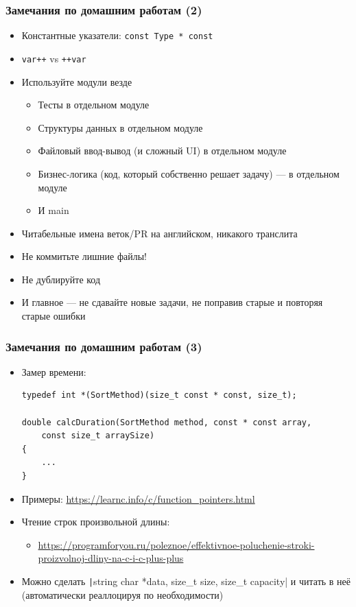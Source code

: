 \documentclass{../../slides-style}
\begin{document}
    \begin{frame}
        \frametitle{Замечания по домашним работам (2)}
        \begin{itemize}
            \item Константные указатели: \texttt{const Type * const}
            \item \texttt{var++} vs \texttt{++var}
            \item Используйте модули везде
            \begin{itemize}
                \item Тесты в отдельном модуле
                \item Структуры данных в отдельном модуле
                \item Файловый ввод-вывод (и сложный UI) в отдельном модуле
                \item Бизнес-логика (код, который собственно решает задачу) --- в отдельном модуле
                \item И main
            \end{itemize}
            \item Читабельные имена веток/PR на английском, никакого транслита
            \item Не коммитьте лишние файлы!
            \item Не дублируйте код
            \item И главное --- не сдавайте новые задачи, не поправив старые и повторяя старые ошибки
        \end{itemize}
    \end{frame}

    \begin{frame}[fragile]
        \frametitle{Замечания по домашним работам (3)}
        \begin{itemize}
            \item Замер времени:
            \begin{verbatim}
typedef int *(SortMethod)(size_t const * const, size_t);

double calcDuration(SortMethod method, const * const array, 
    const size_t arraySize) 
{
    ...
}
            \end{verbatim}
            \item Примеры: \url{https://learnc.info/c/function_pointers.html}
            \item Чтение строк произвольной длины:
            \begin{itemize}
                \item \url{https://programforyou.ru/poleznoe/effektivnoe-poluchenie-stroki-proizvolnoj-dliny-na-c-i-c-plus-plus}
            \end{itemize}
            \item Можно сделать \texttt|string {char *data, size_t size, size_t capacity}| и читать в неё (автоматически реаллоцируя по необходимости)
        \end{itemize}
    \end{frame}
\end{document}
